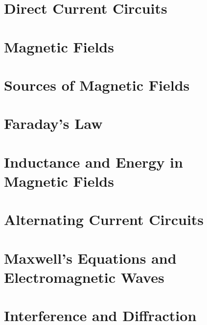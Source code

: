 \section{Direct Current Circuits}
\section{Magnetic Fields}
\section{Sources of Magnetic Fields}
\section{Faraday's Law}
\section{Inductance and Energy in Magnetic Fields}
\section{Alternating Current Circuits}
\section{Maxwell's Equations and Electromagnetic Waves}
\section{Interference and Diffraction}


